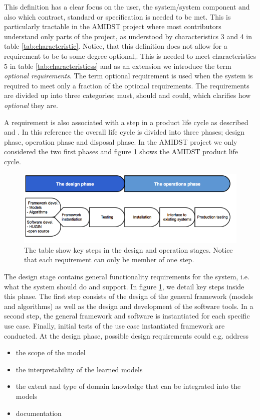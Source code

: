 \documentclass[11pt, oneside]{article}   	%
\begin{document}
This definition has a clear focus on the user, the system/system component and also which contract, standard or specification is needed to be met.  This is particularly tractable in the AMIDST project where most contributors understand only parts of the project, as understood by characteristics 3 and 4 in table \ref{tab:characteristic}. Notice, that this definition does not allow for a requirement to be to some degree optional,.  This is needed to meet characteristics 5 in table \ref{tab:characteristicss} and as an extension we introduce the term \emph{optional requirements}. The term optional requirement is used when the system is required to meet only a fraction of the optional requirements.  The requirements are divided up into three categories; must, should and could, which clarifies how \emph{optional} they are.

A requirement is also associated with a step in a product life cycle as described and \cite{Eig09}.  In this reference the overall life cycle is divided into three phases; design phase, operation phase and disposal phase.  In the AMIDST project we only considered the two first phases and figure \ref{REprocess2} shows the AMIDST product life cycle.

\begin{figure}
\centering
\includegraphics [keepaspectratio,width = 14cm] {REprocess2}
\caption{The table show key steps in the design and operation stages. Notice that each requirement can only be member of one step.}
\label{REprocess2}
\end{figure}

The design stage contains general functionality requirements for the system, i.e. what the system should do and support.  In figure \ref{REprocess2}, we detail key steps inside this phase. The first step consists of the design of the general framework (models and algorithms) as well as the design and development of the software tools. In a second step, the general framework and software is instantiated for each specific use case. Finally, initial tests of the use case instantiated framework are conducted.  At the design phase, possible design requirements could e.g. address
\begin{itemize}
 \item the scope of the model
 \item the interpretability of the learned models
 \item the extent and type of domain knowledge that can be integrated into the models
 \item documentation
\end{itemize}
\end{document}
